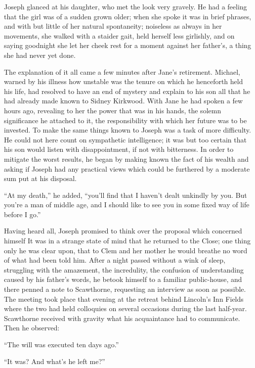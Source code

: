 Joseph glanced at his daughter, who met the look very gravely. He had a
feeling that the girl was of a sudden grown older; when she spoke it was
in brief phrases, and with but little of her natural spontaneity;
noiseless as always in her movements, she walked with a staider gait,
held herself less girlishly, and on saying goodnight she let her cheek
rest for a moment against her father's, a thing she had never yet done.

The explanation of it all came a few minutes after Jane's retirement.
Michael, warned by his illness how unstable was the tenure on which he
henceforth held his life, had resolved to have an end of mystery and
explain to his son all that he had already {}made known to Sidney
Kirkwood. With Jane he had spoken a few hours ago, revealing to her the
power that was in his hands, the solemn significance he attached to it,
the responsibility with which her future was to be invested. To make the
same things known to Joseph was a task of more difficulty. He could not
here count on sympathetic intelligence; it was but too certain that his
son would listen with disappointment, if not with bitterness. In order
to mitigate the worst results, he began by making known the fact of his
wealth and asking if Joseph had any practical views which could be
furthered by a moderate sum put at his disposal.

``At my death,'' he added, ``you'll find that I haven't dealt unkindly
by you. But you're a man of middle age, and I should like to see you in
some fixed way of life before I go.''

Having heard all, Joseph promised to think over the proposal which
concerned himself It was in a strange state of mind that he returned to
the Close; one thing only he was clear upon, that to Clem and her mother
he {}would breathe no word of what had been told him. After a night
passed without a wink of sleep, struggling with the amazement, the
incredulity, the confusion of understanding caused by his father's
words, he betook himself to a familiar public-house, and there penned a
note to Scawthorne, requesting an interview as soon as possible. The
meeting took place that evening at the retreat behind Lincoln's Inn
Fields where the two had held colloquies on several occasions during the
last half-year. Scawthorne received with gravity what his acquaintance
had to communicate. Then he observed:

``The will was executed ten days ago.''

``It was? And what's he left me?''

